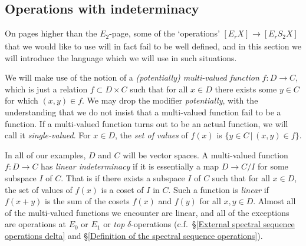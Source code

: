 \documentclass[11pt]{amsart} \renewcommand{\baselinestretch}{1.2}
\theoremstyle{plain}
\numberwithin{equation}{section} %
\theoremstyle{plain}
\numberwithin{equation}{chapter} %
\renewcommand{\to}{\longrightarrow}
\newcommand{\E}[5]{[E^{#1}_{#2}#3]^{#4}_{#5}}
\newcommand{\SubsectionOrSection}[1]{\subsection{#1}}
\begin{document}
\begin{second quadrant homotopy sseq operations}
\SubsectionOrSection{Operations with indeterminacy}
\label{Operations with indeterminacy}
On pages higher than the $E_2$-page, some of the `operations' 
$\E{}{r}{X}{}{}\to \E{}{r}{S_2X}{}{}$
that we would like to use will in fact fail to be well defined, and in this section we will introduce the language which we will use in such situations.

We will make use of the notion of a  \emph{(potentially) multi-valued function} $f:D\to C$, which  is just a relation
$f\subset D\times C$
such that for all $x\in D$ there exists some $y\in C$ for which $(x,y)\in f$. We may drop the modifier \emph{potentially}, with the understanding that we do not insist that a multi-valued function fail to be a function. If a multi-valued function turns out to be an actual function, we will call it \emph{single-valued}. For $x\in D$, the \emph{set of values} of $f(x)$ is 
$\{y\in C\,|\,(x,y)\in f\}$.

In all of our examples, $D$ and $C$ will be vector spaces. A multi-valued function $f:D\to C$ has \emph{linear indeterminacy} if it is essentially a map $D\to C/I$ for some subspace $I$ of $C$. That is if there exists a subspace $I$ of $C$ such that for all $x\in D$, the set of values of $f(x)$ is a coset of $I$ in $C$. Such a function is \emph{linear} if $f(x+y)$ is the sum of the cosets $f(x)$ and $f(y)$ for all $x,y\in D$. Almost all of the multi-valued functions we encounter are linear, and all of the exceptions are operations at $E_0$ or $E_1$ or \emph{top} $\delta$-operations (c.f.\ \S\ref{External spectral sequence operations delta} and \S\ref{Definition of the spectral sequence operations}).
%


\end{second quadrant homotopy sseq operations}
\end{document}

